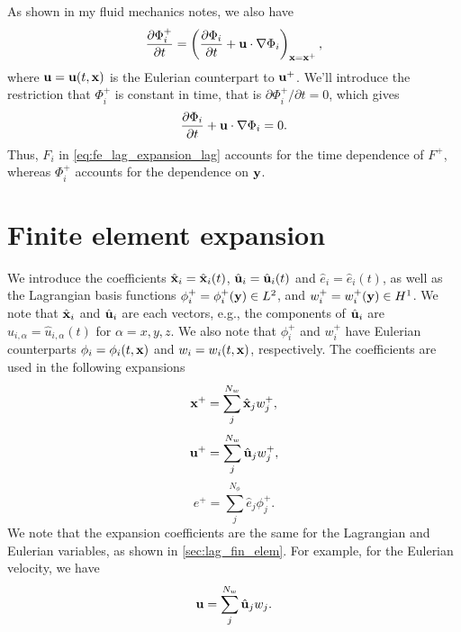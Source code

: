 \documentclass[11pt]{report}
\begin{document}
As shown in my fluid mechanics notes, we also have
\begin{equation}
    \label{eq:lag_fe_deriv_correspondence}
    \frac{\partial \Phi_i^+}{\partial t} = \left ( \frac{\partial \Phi_i}{\partial t} + \mathbf{u} \cdot \nabla \Phi_i \right )_{\mathbf{x} = \mathbf{x}^+},
\end{equation}
where $\mathbf{u} = \mathbf{u}(t,\mathbf{x})$ is the Eulerian counterpart to $\mathbf{u}^+$. We'll introduce the restriction that $\Phi_i^+$ is constant in time, that is $\partial \Phi_i^+/\partial t = 0$, which gives
\begin{equation}
    \frac{\partial \Phi_i}{\partial t} + \mathbf{u} \cdot \nabla \Phi_i = 0.
\end{equation}
Thus, $F_i$ in \cref{eq:fe_lag_expansion_lag} accounts for the time dependence of $F^+$, whereas $\Phi_i^+$ accounts for the dependence on $\mathbf{y}$.

\section{Finite element expansion}
We introduce the coefficients $\hat{\mathbf{x}}_i = \hat{\mathbf{x}}_i(t)$, $\hat{\mathbf{u}}_i = \hat{\mathbf{u}}_i(t)$ and $\hat{e}_i = \hat{e}_i(t)$, as well as the Lagrangian basis functions $\phi^+_i = \phi^+_i(\mathbf{y}) \in L^2$, and $w^+_i = w^+_i(\mathbf{y}) \in H^1$. We note that $\hat{\mathbf{x}}_i$ and $\hat{\mathbf{u}}_i$ are each vectors, e.g., the components of $\hat{\mathbf{u}}_i$ are $\hat{u}_{i,\alpha} = \hat{u}_{i,\alpha}(t)$ for $\alpha = x,y,z$. We also note that $\phi^+_i$ and $w^+_i$ have Eulerian counterparts $\phi_i = \phi_i(t,\mathbf{x})$ and $w_i = w_i(t,\mathbf{x})$, respectively. The coefficients are used in the following expansions
\begin{equation}
    \label{eq:fe_exp_x}
    \mathbf{x}^+ = \sum_j^{N_w} \hat{\mathbf{x}}_j w^+_j,
\end{equation}
\begin{equation}
    \label{eq:fe_exp_u}
    \mathbf{u}^+ = \sum_j^{N_w} \hat{\mathbf{u}}_j w^+_j,
\end{equation}
\begin{equation}
    \label{eq:fe_exp_e}
    e^+ = \sum_j^{N_\phi} \hat{e}_j \phi^+_j.
\end{equation}
We note that the expansion coefficients are the same for the Lagrangian and Eulerian variables, as shown in \cref{sec:lag_fin_elem}. For example, for the Eulerian velocity, we have
\begin{equation}
    \mathbf{u} = \sum_j^{N_w} \hat{\mathbf{u}}_j w_j.
\end{equation}
\end{document}

